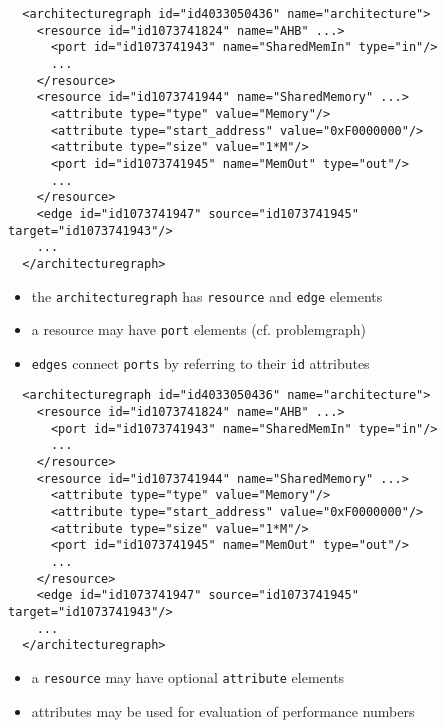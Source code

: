 \begin{frame}[fragile=singleslide]
\begin{lstlisting}
  <architecturegraph id="id4033050436" name="architecture">
    <resource id="id1073741824" name="AHB" ...>
      <port id="id1073741943" name="SharedMemIn" type="in"/>
      ...
    </resource>
    <resource id="id1073741944" name="SharedMemory" ...>
      <attribute type="type" value="Memory"/>
      <attribute type="start_address" value="0xF0000000"/>
      <attribute type="size" value="1*M"/>
      <port id="id1073741945" name="MemOut" type="out"/>
      ...
    </resource>
    <edge id="id1073741947" source="id1073741945" target="id1073741943"/>
    ...
  </architecturegraph>
\end{lstlisting}
\begin{itemize}
\item the \lstinline|architecturegraph| has \lstinline|resource| and \lstinline|edge| elements
\item a resource may have \lstinline|port| elements (cf. problemgraph)
\item \lstinline|edges| connect \lstinline|ports| by referring to their \lstinline|id| attributes
\end{itemize}
\end{frame}


\begin{frame}[fragile=singleslide]
\begin{lstlisting}
  <architecturegraph id="id4033050436" name="architecture">
    <resource id="id1073741824" name="AHB" ...>
      <port id="id1073741943" name="SharedMemIn" type="in"/>
      ...
    </resource>
    <resource id="id1073741944" name="SharedMemory" ...>
      <attribute type="type" value="Memory"/>
      <attribute type="start_address" value="0xF0000000"/>
      <attribute type="size" value="1*M"/>
      <port id="id1073741945" name="MemOut" type="out"/>
      ...
    </resource>
    <edge id="id1073741947" source="id1073741945" target="id1073741943"/>
    ...
  </architecturegraph>
\end{lstlisting}
\begin{itemize}
\item a \lstinline|resource| may have optional \lstinline|attribute| elements
\item attributes may be used for evaluation of performance numbers
\end{itemize}
\end{frame}


